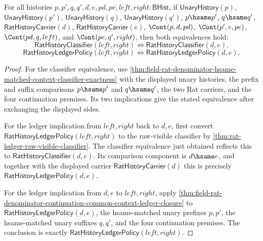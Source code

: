\begin{theorem}
\label{thm:field-rat-denominator-hsame-matched-context-exactness-package}
For all histories
$p,p',q,q',d,e,pd,pe,left,right:\mathsf{BHist}$, if
$\mathsf{UnaryHistory}(p)$, $\mathsf{UnaryHistory}(p')$,
$\mathsf{UnaryHistory}(q)$, $\mathsf{UnaryHistory}(q')$, $p\hsame p'$,
$q\hsame q'$, $\mathsf{RatHistoryCarrier}(d)$,
$\mathsf{RatHistoryCarrier}(e)$, $\Cont(p,d,pd)$, $\Cont(p',e,pe)$,
$\Cont(pd,q,left)$, and $\Cont(pe,q',right)$, then both equivalences hold:
$$
\mathsf{RatHistoryClassifier}(left,right)\Longleftrightarrow
\mathsf{RatHistoryClassifier}(d,e).
$$
$$
\mathsf{RatHistoryLedgerPolicy}(left,right)\Longleftrightarrow
\mathsf{RatHistoryLedgerPolicy}(d,e).
$$
\end{theorem}
\begin{proof}
For the classifier equivalence, use
\autoref{thm:field-rat-denominator-hsame-matched-context-classifier-exactness}
with the displayed unary histories, the prefix and suffix comparisons
$p\hsame p'$ and $q\hsame q'$, the two Rat carriers, and the four continuation
premises. Its two implications give the stated equivalence after exchanging
the displayed sides.

For the ledger implication from $left,right$ back to $d,e$, first convert
$\mathsf{RatHistoryLedgerPolicy}(left,right)$ to the raw-visible classifier by
\autoref{thm:rat-ledger-raw-visible-classifier}. The classifier equivalence
just obtained reflects this to $\mathsf{RatHistoryClassifier}(d,e)$. Its
comparison component is $d\hsame e$, and together with the displayed carrier
$\mathsf{RatHistoryCarrier}(d)$ this is precisely
$\mathsf{RatHistoryLedgerPolicy}(d,e)$.

For the ledger implication from $d,e$ to $left,right$, apply
\autoref{thm:field-rat-denominator-continuation-common-context-ledger-closure}
to $\mathsf{RatHistoryLedgerPolicy}(d,e)$, the hsame-matched unary prefixes
$p,p'$, the hsame-matched unary suffixes $q,q'$, and the four continuation
premises. The conclusion is exactly
$\mathsf{RatHistoryLedgerPolicy}(left,right)$.
\end{proof}


